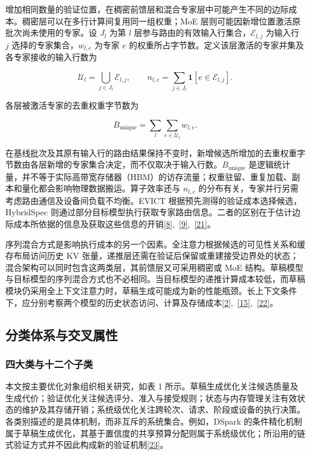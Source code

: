 \documentclass[11pt,a4paper,UTF8,fontset=none,scheme=plain,zihao=-4]{ctexart}
\begin{document}
增加相同数量的验证位置，在稠密前馈层和混合专家层中可能产生不同的边际成本。稠密层可以在多行计算间复用同一组权重；MoE
层则可能因新增位置激活原批次尚未使用的专家。设 \(J_l\) 为第 \(l\)
层参与路由的有效输入行集合，\(\mathcal E_{l,j}\) 为输入行 \(j\)
选择的专家集合，\(w_{l,e}\) 为专家 \(e\)
的权重所占字节数。定义该层激活的专家并集及各专家接收的输入行数为

\[
\mathcal U_l=\bigcup_{j\in J_l}\mathcal E_{l,j},
\qquad
n_{l,e}=\sum_{j\in J_l}\mathbf 1[e\in\mathcal E_{l,j}].
\]

各层被激活专家的去重权重字节数为

\[
B_{\mathrm{unique}}=\sum_l\sum_{e\in\mathcal U_l}w_{l,e}.
\]

在基线批次及其原有输入行的路由结果保持不变时，新增候选所增加的去重权重字节数由各层新增的专家集合决定，而不仅取决于输入行数。\(B_{\mathrm{unique}}\)
是逻辑统计量，并不等于实际高带宽存储器（HBM）的访存流量；权重驻留、重复加载、副本和量化都会影响物理数据搬运。算子效率还与
\(n_{l,e}\)
的分布有关，专家并行另需考虑路由通信及设备间负载不均衡。EVICT
根据预先测得的验证成本选择候选，HybridSpec
则通过部分目标模型执行获取专家路由信息。二者的区别在于估计边际成本所依据的信息及获取这些信息的开销\protect\hyperlink{ref-evict}{{[}8{]}},~\protect\hyperlink{ref-hybridspec}{{[}9{]}},~\protect\hyperlink{ref-moebytes}{{[}21{]}}。

序列混合方式是影响执行成本的另一个因素。全注意力根据候选的可见性关系和缓存布局访问历史
KV
张量，递推层还需在验证后保留或重建接受边界处的状态；混合架构可以同时包含这两类层，其前馈层又可采用稠密或
MoE
结构。草稿模型与目标模型的序列混合方式也不必相同。当目标模型的递推计算成本较低，而草稿模块仍采用全上下文注意力时，草稿生成可能成为新的性能瓶颈。长上下文条件下，应分别考察两个模型的历史状态访问、计算及存储成本\protect\hyperlink{ref-magicdec}{{[}2{]}},~\protect\hyperlink{ref-replayssm}{{[}15{]}},~\protect\hyperlink{ref-windowedmtp}{{[}22{]}}。

\hypertarget{section-2-3}{%
\subsection{分类体系与交叉属性}\label{section-2-3}}

\hypertarget{section-2-3-1}{%
\subsubsection{四大类与十二个子类}\label{section-2-3-1}}

本文按主要优化对象组织相关研究，如表 1
所示。草稿生成优化关注候选质量及生成代价；验证优化关注候选评分、准入与接受规则；状态与内存管理关注有效状态的维护及其存储开销；系统级优化关注跨轮次、请求、阶段或设备的执行决策。各类别描述的是具体机制，而非互斥的系统集合。例如，DSpark
的条件精化机制属于草稿生成优化，其基于置信度的共享预算分配则属于系统级优化；所沿用的链式验证方式并不因此构成新的验证机制\protect\hyperlink{ref-dspark}{{[}23{]}}。
\end{document}
